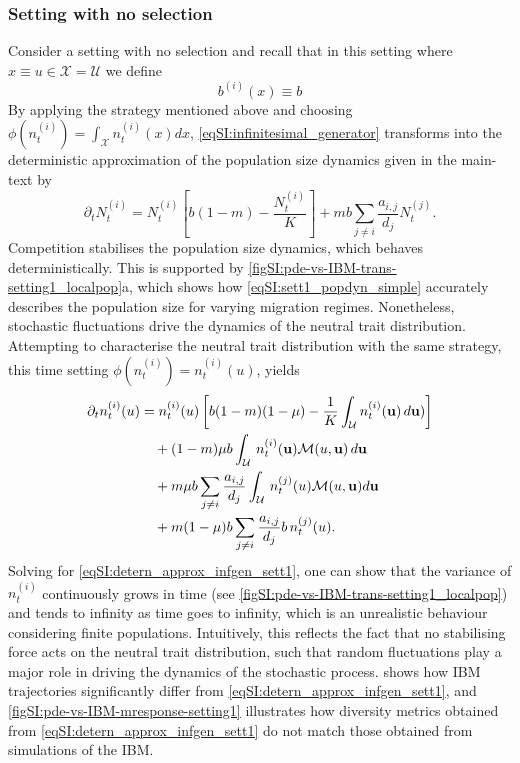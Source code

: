     \subsubsection{Setting with no selection}
    Consider a setting with no selection and recall that in this setting where $x \equiv u \in \mathcal{X} = \mathcal{U}$ we define
    \begin{equation}\label{eqSI:b_d_sett1}
      b^{(i)}(x) \equiv b 
    \end{equation}
    By applying the strategy mentioned above and choosing $\phi(n^{(i)}_t) = \int_\mathcal{X} n^{(i)}_t(x) dx$, \cref{eqSI:infinitesimal_generator} transforms into the deterministic approximation of the population size dynamics given in the main-text by
    \begin{equation}\label{eqSI:sett1_popdyn_simple}
      \partial_t N_t^{(i)} = N_t^{(i)} \left[ b(1-m) - \frac{N_t^{(i)}}{K} \right] +  m b \sum_{j\neq i}\frac{a_{i,j}}{d_j}  N_t^{(j)} .
    \end{equation}
    Competition stabilises the population size dynamics, which behaves deterministically. This is supported by \cref{figSI:pde-vs-IBM-trans-setting1_localpop}a, which shows how \cref{eqSI:sett1_popdyn_simple} accurately describes the population size for varying migration regimes. Nonetheless, stochastic fluctuations drive the dynamics of the neutral trait distribution. Attempting to characterise the neutral trait distribution with the same strategy, this time setting $\phi(n^{(i)}_t) = n^{(i)}_t(u)$, yields
    \begin{equation}\label{eqSI:detern_approx_infgen_sett1}
    \begin{split}
    \partial_t n_t^{(i)}(u) &= n_t^{(i)}(u)\left[b(1-m)(1-\mu) - \frac{1}{K}\int_\mathcal{U} n_t^{(i)}({\textbf u}) \, d {\textbf u})\right] \\
    &\quad + (1- m)\mu b \int_\mathcal{U} \, n_t^{(i)}( {\textbf u})  \mathcal{M}( u, {\textbf u}) \, d{\textbf u} \\
    &\quad + m \mu b \sum_{j\neq i}\frac{a_{i,j}}{d_j}  \int_\mathcal{U} \,  n_t^{(j)}(u) \mathcal{M}( u, {\textbf u}) d{\textbf u}\\
    &\quad + m (1 - \mu) b \sum_{j\neq i}\frac{a_{i,j}}{d_j} b \, n_t^{(j)}(u).
  \end{split}
\end{equation}
%
Solving for \cref{eqSI:detern_approx_infgen_sett1}, one can show that the variance of $n_t^{(i)}$ continuously grows in time (see \cref{figSI:pde-vs-IBM-trans-setting1_localpop}) and tends to infinity as time goes to infinity, which is an unrealistic behaviour considering finite populations. Intuitively, this reflects the fact that no stabilising force acts on the neutral trait distribution, such that random fluctuations play a major role in driving the dynamics of the stochastic process.
%
 shows how IBM trajectories significantly differ from \cref{eqSI:detern_approx_infgen_sett1}, and \cref{figSI:pde-vs-IBM-mresponse-setting1} illustrates how diversity metrics obtained from \cref{eqSI:detern_approx_infgen_sett1} do not match those obtained from simulations of the IBM.

